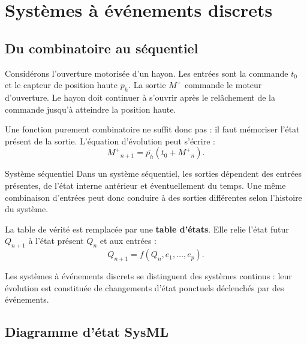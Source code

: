 
\section{Systèmes à événements discrets}
\label{sec:sed}

\subsection{Du combinatoire au séquentiel}

Considérons l'ouverture motorisée d'un hayon. Les entrées sont la commande $t_0$ et le capteur de position haute $p_h$. La sortie $M^+$ commande le moteur d'ouverture. Le hayon doit continuer à s'ouvrir après le relâchement de la commande jusqu'à atteindre la position haute.

Une fonction purement combinatoire ne suffit donc pas : il faut mémoriser l'état présent de la sortie. L'équation d'évolution peut s'écrire :
\[
{M^+}_{n+1}=\overline{p_h}\left(t_0+{M^+}_n\right).
\]


\begin{TLLogicDefinition}{Système séquentiel}
Dans un système séquentiel, les sorties dépendent des entrées présentes, de l'état interne antérieur et éventuellement du temps. Une même combinaison d'entrées peut donc conduire à des sorties différentes selon l'histoire du système.
\end{TLLogicDefinition}

La table de vérité est remplacée par une \textbf{table d'états}. Elle relie l'état futur $Q_{n+1}$ à l'état présent $Q_n$ et aux entrées :
\[
Q_{n+1}=f(Q_n,e_1,\ldots,e_p).
\]

Les systèmes à événements discrets se distinguent des systèmes continus : leur évolution est constituée de changements d'état ponctuels déclenchés par des événements.

\subsection{Diagramme d'état SysML}

